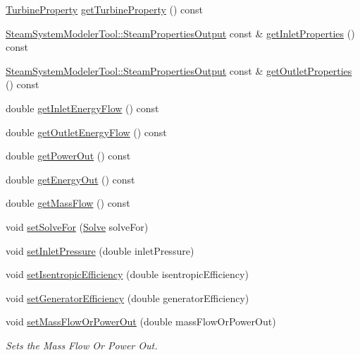 \begin{DoxyCompactItemize}
\hyperlink{class_turbine_a5db4f65cf2539e3837684d53221ade12}{Turbine\+Property} \hyperlink{class_turbine_a14f6eff49b501aa8c5a22d404dbeaac0}{get\+Turbine\+Property} () const
\item 
\hyperlink{struct_steam_system_modeler_tool_1_1_steam_properties_output}{Steam\+System\+Modeler\+Tool\+::\+Steam\+Properties\+Output} const  \& \hyperlink{class_turbine_a7a906cf74affed9acfa4045964eccbf6}{get\+Inlet\+Properties} () const
\item 
\hyperlink{struct_steam_system_modeler_tool_1_1_steam_properties_output}{Steam\+System\+Modeler\+Tool\+::\+Steam\+Properties\+Output} const  \& \hyperlink{class_turbine_aa9449622449e78285a258823ff77c8ec}{get\+Outlet\+Properties} () const
\item 
double \hyperlink{class_turbine_ae5d55a7b882e4780d490d43409f8f06c}{get\+Inlet\+Energy\+Flow} () const
\item 
double \hyperlink{class_turbine_aa20c0f9dd81cd9bfd5eda77f588516b5}{get\+Outlet\+Energy\+Flow} () const
\item 
double \hyperlink{class_turbine_a89585cc2fbfdbe67d539eae08c369fa2}{get\+Power\+Out} () const
\item 
double \hyperlink{class_turbine_a143fc660274e0d65ccb8fc55cc2caf83}{get\+Energy\+Out} () const
\item 
double \hyperlink{class_turbine_a4893a203dbbf9db9ca77a0b278c4c118}{get\+Mass\+Flow} () const
\item 
void \hyperlink{class_turbine_a96f54a8fc572dae6c5298289de890f4d}{set\+Solve\+For} (\hyperlink{class_turbine_a9fd7beba6c6f071e228fbe3e07969d2b}{Solve} solve\+For)
\item 
void \hyperlink{class_turbine_a04996baab9a40d449a69c737c00be8e4}{set\+Inlet\+Pressure} (double inlet\+Pressure)
\item 
void \hyperlink{class_turbine_ae67daa481ef48bcf8aef84bcccb4611d}{set\+Isentropic\+Efficiency} (double isentropic\+Efficiency)
\item 
void \hyperlink{class_turbine_a51e9c5050a5be51b86dc23e690bd3f40}{set\+Generator\+Efficiency} (double generator\+Efficiency)
\item 
void \hyperlink{class_turbine_a73522631e2eeefa8ea14d5b537e3e760}{set\+Mass\+Flow\+Or\+Power\+Out} (double mass\+Flow\+Or\+Power\+Out)
\begin{DoxyCompactList}\small\item\em Sets the Mass Flow Or Power Out. \end{DoxyCompactList}\item 

\end{DoxyCompactItemize}
